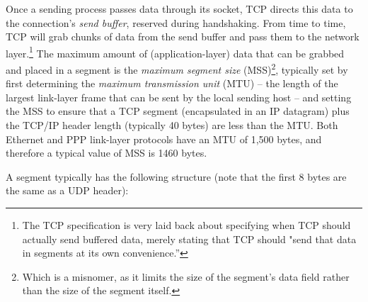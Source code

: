 \documentclass[8pt, table, xcdraw]{article}%
\begin{document}
Once a sending process passes data through its socket, TCP directs this data to the connection's \emph{send buffer}, reserved during handshaking. From time to time, TCP will grab chunks of data from the send buffer and pass them to the network layer.\footnote{The TCP specification is very laid back about specifying when TCP should actually send buffered data, merely stating that TCP should "send that data in segments at its own convenience.”} The maximum amount of (application-layer) data that can be grabbed and placed in a segment is the \emph{maximum segment size} (MSS)\footnote{Which is a misnomer, as it limits the size of the segment's data field rather than the size of the segment itself.}, typically set by first determining the \emph{maximum transmission unit} (MTU) -- the length of the largest link-layer frame that can be sent by the local sending host -- and setting the MSS to ensure that a TCP segment (encapsulated in an IP datagram) plus the TCP/IP header length (typically 40 bytes) are less than the MTU. Both Ethernet and PPP link-layer protocols have an MTU of 1,500 bytes, and therefore a typical value of MSS is 1460 bytes.

A segment typically has the following structure (note that the first 8 bytes are the same as a UDP header):
\end{document}
